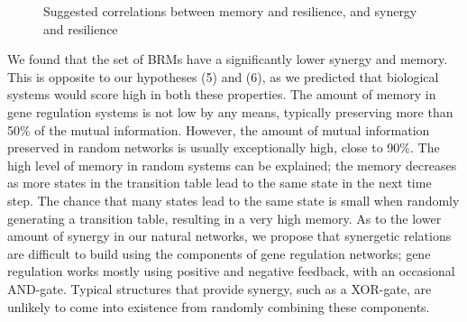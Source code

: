 \documentclass[../main.tex]{subfiles}
\begin{document}
\def\firstcircle{(0:-0.9cm) circle (2cm)}
\def\thirdcircle{(0:0.9cm) circle (2cm)}
\begin{figure}[ht]
\begin{center}
\end{center}
\caption{Suggested correlations between memory and resilience, and synergy and resilience}
\label{venn_results}
\end{figure}

We found that the set of BRMs have a significantly lower synergy and memory.
This is opposite to our hypotheses (5) and (6), as we predicted that biological systems would score high in both these properties.
The amount of memory in gene regulation systems is not low by any means, typically preserving more than 50\% of the mutual information.
However, the amount of mutual information preserved in random networks is usually exceptionally high, close to 90\%.
The high level of memory in random systems can be explained; the memory decreases as more states in the transition table lead to the same state in the next time step.
The chance that many states lead to the same state is small when randomly generating a transition table, resulting in a very high memory.
As to the lower amount of synergy in our natural networks, we propose that synergetic relations are difficult to build using the components of gene regulation networks; gene regulation works mostly using positive and negative feedback, with an occasional AND-gate.
Typical structures that provide synergy, such as a XOR-gate, are unlikely to come into existence from randomly combining these components.
\end{document}
